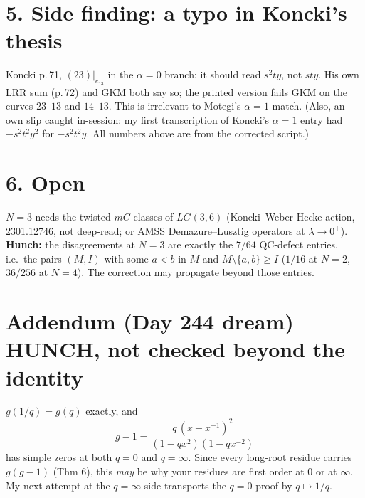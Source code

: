 \documentclass[10pt]{article}
\begin{document}
\section*{5. Side finding: a typo in Koncki's thesis}
Koncki p.\,71, $(23)|_{e_{13}}$ in the $\alpha=0$ branch: it should read $s^2ty$, not $sty$. His own LRR sum (p.\,72) and GKM both say so; the printed version fails GKM on the curves
$23$--$13$ and $14$--$13$. This is irrelevant to Motegi's $\alpha=1$ match. (Also, an own slip caught in-session: my first transcription of Koncki's $\alpha=1$ entry had $-s^2t^2y^2$ for
$-s^2t^2y$. All numbers above are from the corrected script.)

\section*{6. Open}
$N=3$ needs the twisted $mC$ classes of $LG(3,6)$ (Koncki--Weber Hecke action, 2301.12746, not deep-read; or AMSS Demazure--Lusztig operators at $\lambda\to0^+$).
\textbf{Hunch:} the disagreements at $N=3$ are exactly the $7/64$ QC-defect entries, i.e.\ the pairs $(M,I)$ with some $a<b$ in $M$ and $M\setminus\{a,b\}\ge I$
($1/16$ at $N=2$, $36/256$ at $N=4$). The correction may propagate beyond those entries.

\section*{Addendum (Day 244 dream) --- HUNCH, not checked beyond the identity}
$g(1/q)=g(q)$ exactly, and
\[ g-1=\frac{q\,(x-x^{-1})^2}{(1-qx^2)(1-qx^{-2})} \]
has simple zeros at both $q=0$ and $q=\infty$. Since every long-root residue carries $g(g-1)$ (Thm 6), this \emph{may} be why your residues are first order at $0$ or at $\infty$.
My next attempt at the $q=\infty$ side transports the $q=0$ proof by $q\mapsto1/q$.
\end{document}

